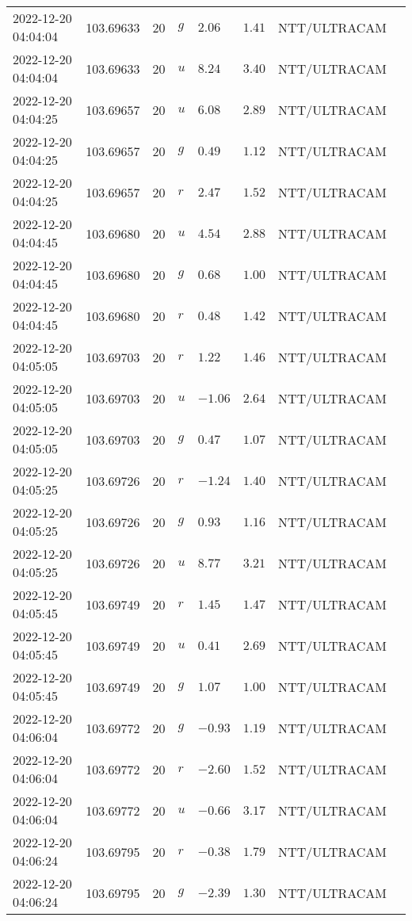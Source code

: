 \documentclass{nature_plusfigure}
\begin{document}
\begin{supplement}
\begin{center}
\begin{longtable}{llllllll}
2022-12-20 04:04:04 & 103.69633 & 20 & $g$ & $2.06$ & $1.41$ & NTT/ULTRACAM &  \\ 
2022-12-20 04:04:04 & 103.69633 & 20 & $u$ & $8.24$ & $3.40$ & NTT/ULTRACAM &  \\ 
2022-12-20 04:04:25 & 103.69657 & 20 & $u$ & $6.08$ & $2.89$ & NTT/ULTRACAM &  \\ 
2022-12-20 04:04:25 & 103.69657 & 20 & $g$ & $0.49$ & $1.12$ & NTT/ULTRACAM &  \\ 
2022-12-20 04:04:25 & 103.69657 & 20 & $r$ & $2.47$ & $1.52$ & NTT/ULTRACAM &  \\ 
2022-12-20 04:04:45 & 103.69680 & 20 & $u$ & $4.54$ & $2.88$ & NTT/ULTRACAM &  \\ 
2022-12-20 04:04:45 & 103.69680 & 20 & $g$ & $0.68$ & $1.00$ & NTT/ULTRACAM &  \\ 
2022-12-20 04:04:45 & 103.69680 & 20 & $r$ & $0.48$ & $1.42$ & NTT/ULTRACAM &  \\ 
2022-12-20 04:05:05 & 103.69703 & 20 & $r$ & $1.22$ & $1.46$ & NTT/ULTRACAM &  \\ 
2022-12-20 04:05:05 & 103.69703 & 20 & $u$ & $-1.06$ & $2.64$ & NTT/ULTRACAM &  \\ 
2022-12-20 04:05:05 & 103.69703 & 20 & $g$ & $0.47$ & $1.07$ & NTT/ULTRACAM &  \\ 
2022-12-20 04:05:25 & 103.69726 & 20 & $r$ & $-1.24$ & $1.40$ & NTT/ULTRACAM &  \\ 
2022-12-20 04:05:25 & 103.69726 & 20 & $g$ & $0.93$ & $1.16$ & NTT/ULTRACAM &  \\ 
2022-12-20 04:05:25 & 103.69726 & 20 & $u$ & $8.77$ & $3.21$ & NTT/ULTRACAM &  \\ 
2022-12-20 04:05:45 & 103.69749 & 20 & $r$ & $1.45$ & $1.47$ & NTT/ULTRACAM &  \\ 
2022-12-20 04:05:45 & 103.69749 & 20 & $u$ & $0.41$ & $2.69$ & NTT/ULTRACAM &  \\ 
2022-12-20 04:05:45 & 103.69749 & 20 & $g$ & $1.07$ & $1.00$ & NTT/ULTRACAM &  \\ 
2022-12-20 04:06:04 & 103.69772 & 20 & $g$ & $-0.93$ & $1.19$ & NTT/ULTRACAM &  \\ 
2022-12-20 04:06:04 & 103.69772 & 20 & $r$ & $-2.60$ & $1.52$ & NTT/ULTRACAM &  \\ 
2022-12-20 04:06:04 & 103.69772 & 20 & $u$ & $-0.66$ & $3.17$ & NTT/ULTRACAM &  \\ 
2022-12-20 04:06:24 & 103.69795 & 20 & $r$ & $-0.38$ & $1.79$ & NTT/ULTRACAM &  \\ 
2022-12-20 04:06:24 & 103.69795 & 20 & $g$ & $-2.39$ & $1.30$ & NTT/ULTRACAM &  \\ 

\end{longtable}
\end{center}
\end{supplement}
\end{document}
